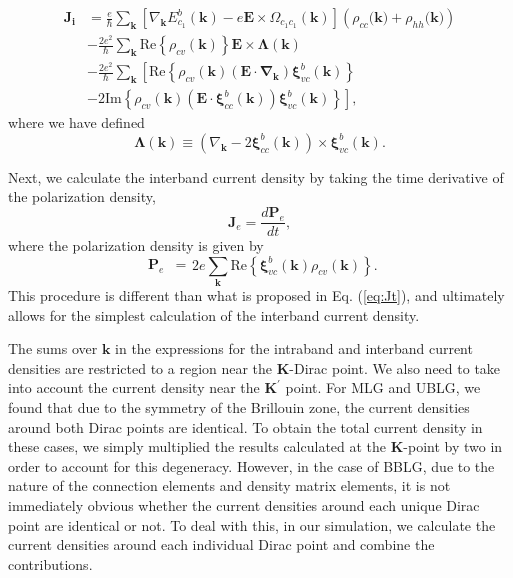 \documentclass[twocolumn,secnumarabic,amssymb, nobibnotes, aps, prd, superscriptaddress]{revtex4-1}
\begin{document}
\begin{equation}\begin{aligned}\mathbf{J_{i}} & =\frac{e}{\hbar}\sum_{\mathbf{k}}\left[\nabla_{\mathbf{\mathbf{k}}}E_{c_{1}}^{b}(\mathbf{k})-e\mathbf{E}\times\Omega_{c_{1}c_{1}}(\mathbf{k})\right]\left(\rho_{cc}(\mathbf{k)}+\rho_{hh}(\mathbf{k)}\right)\\
 & -\frac{2e^{2}}{\hbar}\sum_{\mathbf{k}}\text{Re}\left\{ \rho_{cv}(\mathbf{k})\right\} \mathbf{E}\times\mathbf{\Lambda}(\mathbf{k})\\
 & -\frac{2e^{2}}{\hbar}\sum_{\mathbf{k}}\left[\text{Re}\left\{ \rho_{cv}(\mathbf{k})\left(\mathbf{E}\cdot\mathbf{\nabla_{\mathbf{k}}}\right)\mathbf{\xi}_{vc}^{b}(\mathbf{k})\right\} \right.\\
 & -\left.2\textrm{Im}\left\{ \rho_{cv}(\mathbf{k})\left(\mathbf{E}\cdot\mathbf{\xi}_{cc}^{b}(\mathbf{k})\right)\mathbf{\xi}_{vc}^{b}(\mathbf{k})\right\} \right],
\end{aligned}
\label{eq:3}\end{equation} where we have defined
\begin{equation}
\mathbf{\Lambda}(\mathbf{k})\equiv\left(\nabla_{\mathbf{\mathbf{k}}}-2\mathbf{\xi}_{cc}^{b}(\mathbf{k})\right)\times\mathbf{\xi}_{vc}^{b}(\mathbf{k}).
\end{equation}

Next, we calculate the interband current density by taking the time derivative of the polarization density, 
\begin{equation}
\mathbf{J}_{e}=\frac{d\mathbf{P}_{e}}{dt},
\end{equation}
where the polarization density is given by
\begin{equation}
\begin{aligned}\mathbf{P}_{e} & =\end{aligned}
2e\sum_{\mathbf{k}}\textrm{Re}\left\{ \mathbf{\xi}_{vc}^{b}(\mathbf{k})\rho_{cv}(\mathbf{k})\right\}.\label{eq:4}
\end{equation} 
This procedure is different than what is proposed in Eq. (\ref{eq:Jt}), and ultimately allows for the simplest calculation of the interband current density. 

The sums over $\mathbf{k}$ in the expressions for the intraband and interband current densities are restricted to a region near the $\mathbf{K}$-Dirac point. We also need to take into account the current density near the $\mathbf{K}^{\prime}$ point. For MLG and UBLG, we found that due to the symmetry of the Brillouin zone, the current densities around both Dirac points are identical\cite{al2015nonperturbative, mcgouran2016nonlinear}. To obtain the total current density in these cases, we simply multiplied the results calculated at the $\mathbf{K}$-point by two in order to account for this degeneracy. However, in the case of BBLG, due to the nature of the connection elements and density matrix elements, it is not immediately obvious whether the current densities around each unique Dirac point are identical or not. To deal with this, in our simulation, we calculate the current densities around each individual Dirac point and combine the contributions.
\end{document}
